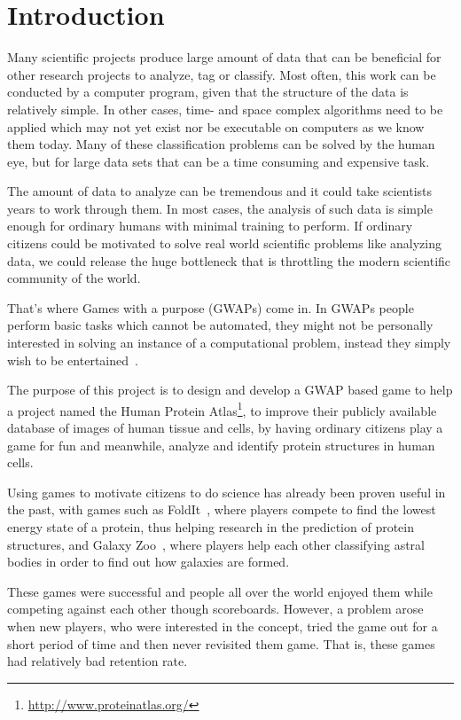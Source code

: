 \section{Introduction}\label{sec:introduction}

Many scientific projects produce large amount of data that can be beneficial for other research projects to analyze, tag or classify. Most often, this work can be conducted by a computer program, given that the structure of the data is relatively simple. In other cases, time- and space complex algorithms need to be applied which may not yet exist nor be executable on computers as we know them today. Many of these classification problems can be solved by the human eye, but for large data sets that can be a time consuming and expensive task.

The amount of data to analyze can be tremendous and it could take scientists years to work through them. In most cases, the analysis of such data is simple enough for 
ordinary humans with minimal training to perform. If ordinary citizens could be motivated to solve real world scientific problems like analyzing data, we could release the huge bottleneck that is throttling the modern scientific community of the world.

That's where Games with a purpose (GWAPs) come in. In GWAPs people perform basic tasks which cannot be automated, they might not be personally interested in solving an instance of a computational problem, instead they simply wish to be entertained~\cite{GWAP}.

The purpose of this project is to design and develop a GWAP based game to help a project named the Human Protein Atlas\footnote{\url{http://www.proteinatlas.org/}}, to improve their publicly available database of images of human tissue and cells, by having ordinary citizens play a game for fun and meanwhile, analyze and identify protein structures in human cells.

Using games to motivate citizens to do science has already been proven useful in the past, with games such as FoldIt~\cite{foldit}, where players compete to find the lowest energy state of a protein, thus helping research in the prediction of protein structures, and Galaxy Zoo~\cite{galaxyzoo}, where players help each other classifying astral bodies in order to find out how galaxies are formed.

These games were successful and people all over the world enjoyed them while competing against each other though scoreboards. However, a problem arose when new players, who were interested in the concept, tried the game out for a short period of time and then never revisited them game. That is, these games had relatively bad retention rate.

